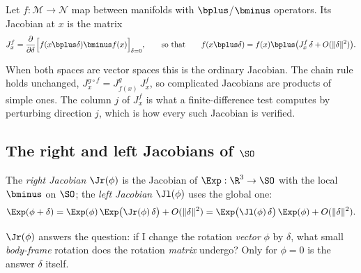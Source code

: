 \begin{definition}
\label{def:manifold-jacobian}
Let $f: \mathcal{M} \to \mathcal{N}$ map between manifolds with $\bplus$/$\bminus$ operators. Its
Jacobian at $x$ is the matrix
\begin{equation}
  J^f_x = \frac{\partial}{\partial\delta}\Big[ f(x\bplus\delta) \bminus f(x) \Big]_{\delta = 0},
  \qquad\text{so that}\qquad f(x\bplus\delta) = f(x)\bplus\big(J^f_x\,\delta + O(\|\delta\|^2)\big).
  \label{eq:manifold-jacobian}
\end{equation}
\end{definition}

When both spaces are vector spaces this is the ordinary Jacobian. The chain rule holds unchanged,
$J^{g\circ f}_x = J^g_{f(x)}\,J^f_x$, so complicated Jacobians are products of simple ones. The column
$j$ of $J^f_x$ is what a finite-difference test computes by perturbing direction $j$, which is how every
such Jacobian is verified.

\subsection{The right and left Jacobians of \texorpdfstring{$\SO$}{SO(3)}}

\begin{definition}
The \emph{right Jacobian} $\Jr(\phi)$ is the Jacobian of $\Exp: \R^3 \to \SO$ with the local $\bminus$ on
$\SO$; the \emph{left Jacobian} $\Jl(\phi)$ uses the global one:
\begin{equation}
  \Exp(\phi + \delta) = \Exp(\phi)\,\Exp\big(\Jr(\phi)\,\delta\big) + O(\|\delta\|^2)
  = \Exp\big(\Jl(\phi)\,\delta\big)\,\Exp(\phi) + O(\|\delta\|^2).
  \label{eq:jr-def}
\end{equation}
\end{definition}

$\Jr(\phi)$ answers the question: if I change the rotation \emph{vector} $\phi$ by $\delta$, what small
\emph{body-frame} rotation does the rotation \emph{matrix} undergo? Only for $\phi = 0$ is the answer
$\delta$ itself.


